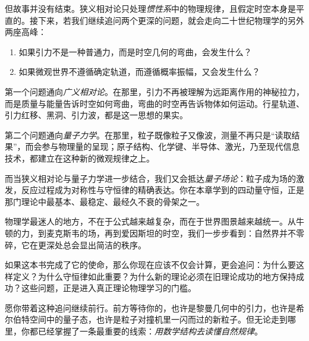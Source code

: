 但故事并没有结束。狭义相对论只处理\emph{惯性系}中的物理规律，且假定时空本身是平直的。接下来，若我们继续追问两个更深的问题，就会走向二十世纪物理学的另外两座高峰：
\begin{enumerate}
  \item 如果引力不是一种普通力，而是时空几何的弯曲，会发生什么？
  \item 如果微观世界不遵循确定轨道，而遵循概率振幅，又会发生什么？
\end{enumerate}

第一个问题通向\emph{广义相对论}。在那里，引力不再被理解为远距离作用的神秘拉力，而是质量与能量告诉时空如何弯曲，弯曲的时空再告诉物体如何运动。行星轨道、引力红移、黑洞、引力波，都是这一思想的果实。

第二个问题通向\emph{量子力学}。在那里，粒子既像粒子又像波，测量不再只是“读取结果”，而会参与物理量的呈现；原子结构、化学键、半导体、激光，乃至现代信息技术，都建立在这种新的微观规律之上。

而当狭义相对论与量子力学进一步结合，我们又会抵达\emph{量子场论}：粒子成为场的激发，反应过程成为对称性与守恒律的精确表达。你在本章学到的四动量守恒，正是那门理论中最基本、最稳定、最经久不衰的骨架之一。

\begin{remark}
物理学最迷人的地方，不在于公式越来越复杂，而在于世界图景越来越统一。从牛顿的力，到麦克斯韦的场，再到爱因斯坦的时空，我们一步步看到：自然界并不零碎，它在更深处总会显出简洁的秩序。
\end{remark}

如果这本书完成了它的使命，那么你现在应该不仅会计算，更会追问：为什么要这样定义？为什么守恒律如此重要？为什么新的理论必须在旧理论成功的地方保持成功？这些问题，正是进入真正理论物理学习的门槛。

愿你带着这种追问继续前行。前方等待你的，也许是黎曼几何中的引力，也许是希尔伯特空间中的量子态，也许是粒子对撞机里一闪而过的新粒子。但无论走到哪里，你都已经掌握了一条最重要的线索：\emph{用数学结构去读懂自然规律}。

